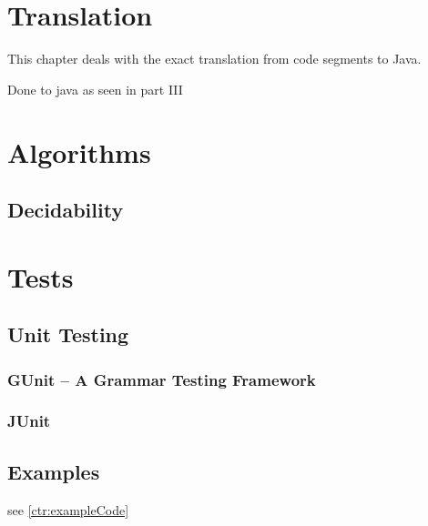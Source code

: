 \chapter{Translation}
\label{ctr:translation}
This chapter deals with the exact translation from \ooplss code segments
to Java.

Done to java as seen in part III


\chapter{Algorithms}

\section{Decidability}

\chapter{Tests}
\section{Unit Testing}
\subsection{GUnit -- A Grammar Testing Framework}
\subsection{JUnit}

\section{Examples}
see \cref{ctr:exampleCode}
